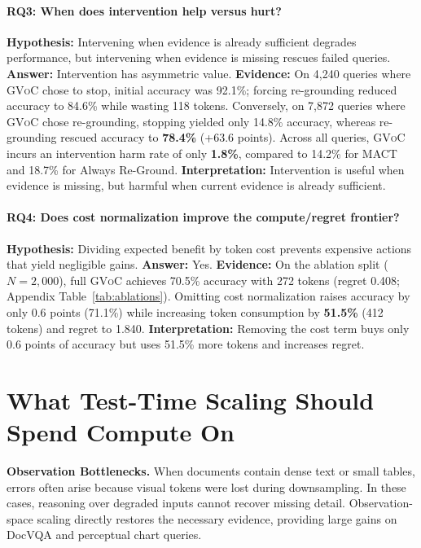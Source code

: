 \documentclass[11pt]{article}
\begin{document}
\paragraph{RQ3: When does intervention help versus hurt?}
\textbf{Hypothesis:} Intervening when evidence is already sufficient degrades performance, but intervening when evidence is missing rescues failed queries.
\textbf{Answer:} Intervention has asymmetric value.
\textbf{Evidence:} On 4,240 queries where \textsc{GVoC} chose to stop, initial accuracy was 92.1\%; forcing re-grounding reduced accuracy to 84.6\% while wasting 118 tokens. Conversely, on 7,872 queries where \textsc{GVoC} chose re-grounding, stopping yielded only 14.8\% accuracy, whereas re-grounding rescued accuracy to \textbf{78.4\%} (+63.6 points). Across all queries, \textsc{GVoC} incurs an intervention harm rate of only \textbf{1.8\%}, compared to 14.2\% for MACT and 18.7\% for Always Re-Ground.
\textbf{Interpretation:} Intervention is useful when evidence is missing, but harmful when current evidence is already sufficient.

\paragraph{RQ4: Does cost normalization improve the compute/regret frontier?}
\textbf{Hypothesis:} Dividing expected benefit by token cost prevents expensive actions that yield negligible gains.
\textbf{Answer:} Yes.
\textbf{Evidence:} On the ablation split ($N=2,000$), full \textsc{GVoC} achieves 70.5\% accuracy with 272 tokens (regret 0.408; Appendix Table~\ref{tab:ablations}). Omitting cost normalization raises accuracy by only 0.6 points (71.1\%) while increasing token consumption by \textbf{51.5\%} (412 tokens) and regret to 1.840.
\textbf{Interpretation:} Removing the cost term buys only 0.6 points of accuracy but uses 51.5\% more tokens and increases regret.

\clearpage

\section{What Test-Time Scaling Should Spend Compute On}
\label{sec:discussion}

\textbf{Observation Bottlenecks.} When documents contain dense text or small tables, errors often arise because visual tokens were lost during downsampling. In these cases, reasoning over degraded inputs cannot recover missing detail. Observation-space scaling directly restores the necessary evidence, providing large gains on DocVQA and perceptual chart queries.
\end{document}

